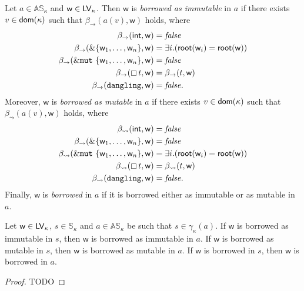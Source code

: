 \begin{definition}\label{def:abstract_borrow}
  Let $a\in\mathbb{AS}_\kappa$ and $\mathsf{w}\in\mathsf{LV}_\kappa$.
  Then $\mathsf{w}$ is
  \emph{borrowed as immutable} in $a$ if there exists $v\in\mathsf{dom}(\kappa)$ such that
  $\beta_\to(a(v),\mathsf{w})$ holds, where
  \begin{align*}
    \beta_\to(\mathsf{int},\mathsf{w})&=\mathit{false}\\
    \beta_\to(\&\{\mathsf{w}_1,\ldots,\mathsf{w}_n\},\mathsf{w})&=\exists i.(\mathsf{root}(\mathsf{w}_i)=\mathsf{root}(\mathsf{w}))\\
    \beta_\to(\&\mathtt{mut}\ \{\mathsf{w}_1,\ldots,\mathsf{w}_n\},\mathsf{w})&=\mathit{false}\\
    \beta_\to(\boxempty\,{t},\mathsf{w})&=\beta_\to(t,\mathsf{w})\\
    \beta_\to(\mathtt{dangling},\mathsf{w})&=\mathit{false.}
  \end{align*}
  Moreover, $\mathsf{w}$ is
  \emph{borrowed as mutable} in $a$ if there exists $v\in\mathsf{dom}(\kappa)$ such that
  $\beta_\leadsto(a(v),\mathsf{w})$ holds, where
  \begin{align*}
    \beta_\leadsto(\mathsf{int},\mathsf{w})&=\mathit{false}\\
    \beta_\leadsto(\&\{\mathsf{w}_1,\ldots,\mathsf{w}_n\},\mathsf{w})&=\mathit{false}\\
    \beta_\leadsto(\&\mathtt{mut}\ \{\mathsf{w}_1,\ldots,\mathsf{w}_n\},\mathsf{w})&=\exists i.(\mathsf{root}(\mathsf{w}_i)=\mathsf{root}(\mathsf{w}))\\
    \beta_\leadsto(\boxempty\,{t},\mathsf{w})&=\beta_\leadsto(t,\mathsf{w})\\
    \beta_\leadsto(\mathtt{dangling},\mathsf{w})&=\mathit{false.}
  \end{align*}
  Finally, $\mathsf{w}$ is \emph{borrowed} in $a$ if it is borrowed either as immutable
  or as mutable in $a$.
\end{definition}

\begin{proposition}
  \label{prop:abstract_borrow_correctness}
  Let $\mathsf{w}\in\mathsf{LV}_\kappa$, $s\in\mathbb{S}_\kappa$
  and $a\in\mathbb{AS}_\kappa$ be
  such that $s\in\gamma_\kappa(a)$.
  If $\mathsf{w}$ is borrowed as immutable in $s$, then
  $\mathsf{w}$ is borrowed as immutable in $a$.
  If $\mathsf{w}$ is borrowed as mutable in $s$, then
  $\mathsf{w}$ is borrowed as mutable in $a$.
  If $\mathsf{w}$ is borrowed in $s$, then
  $\mathsf{w}$ is borrowed in $a$.
\end{proposition}
\begin{proof}
  TODO
\end{proof}

